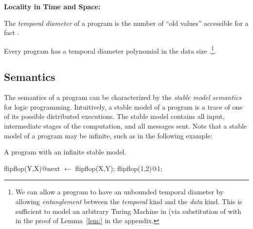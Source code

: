 {\bf Locality in Time and Space:}
\begin{definition}
The {\em temporal diameter} of a \lang program is the number of ``old values'' accessible for a fact .
\end{definition}

Every \lang program has a temporal diameter polynomial in the data size .\footnote{We can allow a program to have an unbounded temporal diameter by allowing {\em entanglement} between the {\em temporal} kind and the {\em data} kind.  This is sufficient to model an arbitrary Turing Machine in \lang (via substitution of  with  in the proof of Lemma~\ref{lem:} in the appendix.}.


%


\subsection{Semantics}
The semantics of a \lang program can be characterized by the {\em stable model semantics}~\cite{stable-model} for logic programming.  Intuitively, a stable model of a \lang program is a trace of one of its possible distributed executions.  The stable model contains all input, intermediate stages of the computation, and all messages sent.  Note that a stable model of a \lang program may be infinite, such as in the following example:

\begin{example}
\label{ex:flipflop}
A \lang program with an infinite stable model.

\begin{Dedalus}
flipflop(Y,X)@next \(\leftarrow\) flipflop(X,Y);
flipflop(1,2)@1;
\end{Dedalus}
\end{example}

